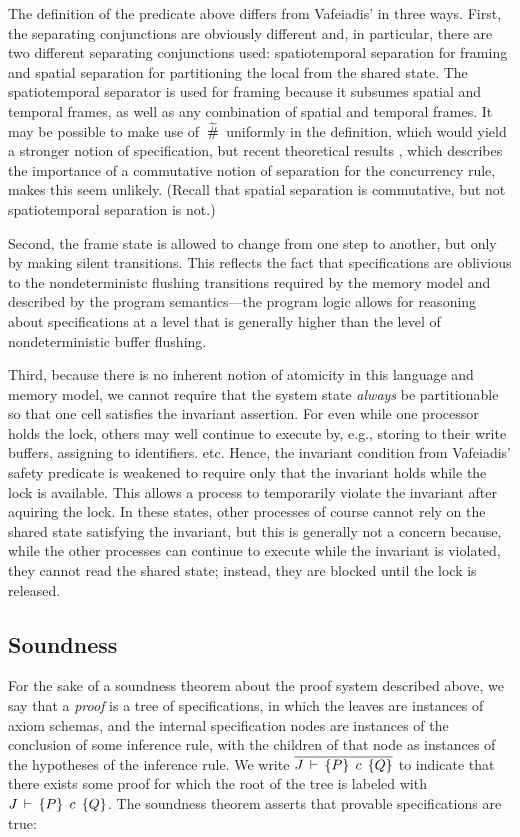 \documentclass[11pt]{report}
\begin{document}
The definition of the predicate above differs from Vafeiadis' in three ways. First, the separating conjunctions are obviously different and, in particular, there are two different separating conjunctions used: spatiotemporal separation for framing and spatial separation for partitioning the local from the shared state. The spatiotemporal separator is used for framing because it subsumes spatial and temporal frames, as well as any combination of spatial and temporal frames. It may be possible to make use of $\operatorname{\,\widetilde{\#}\,}$ uniformly in the definition, which would yield a stronger notion of specification, but recent theoretical results \cite{DBLP:conf/concur/HoareHMOPS11}, which describes the importance of a commutative notion of separation for the concurrency rule, makes this seem unlikely. (Recall that spatial separation is commutative, but not spatiotemporal separation is not.)

Second, the frame state is allowed to change from one step to another, but only by making silent transitions. This reflects the fact that specifications are oblivious to the nondeterministc flushing transitions required by the memory model and described by the program semantics---the program logic allows for reasoning about specifications at a level that is generally higher than the level of nondeterministic buffer flushing. 

Third, because there is no inherent notion of atomicity in this language and memory model, we cannot require that the system state \emph{always} be partitionable so that one cell satisfies the invariant assertion. For even while one processor holds the lock, others may well continue to execute by, e.g., storing to their write buffers, assigning to identifiers. etc. Hence, the invariant condition from Vafeiadis' safety predicate is weakened to require only that the invariant holds while the lock is available. This allows a process to  temporarily violate the invariant after aquiring the lock. In these states, other processes of course cannot rely on the shared state satisfying the invariant, but this is generally not a concern because, while the other processes can continue to execute while the invariant is violated, they cannot read the shared state; instead, they are blocked until the lock is released. 


\subsection{Soundness}

For the sake of a soundness theorem about the proof system described above, we say that a \emph{proof} is a tree of specifications, in which the leaves are instances of axiom schemas, and the internal specification nodes are instances of the conclusion of some inference rule, with the children of that node as instances of the hypotheses of the inference rule. We write $\overline{J\,\vdash\,\left\lbrace P \right\rbrace\;c\;\left\lbrace Q \right\rbrace}$ to indicate that there exists some proof for which the root of the tree is labeled with $J\,\vdash\,\left\lbrace P \right\rbrace\;c\;\left\lbrace Q \right\rbrace$. The soundness theorem asserts that provable specifications are true: 
\end{document}
